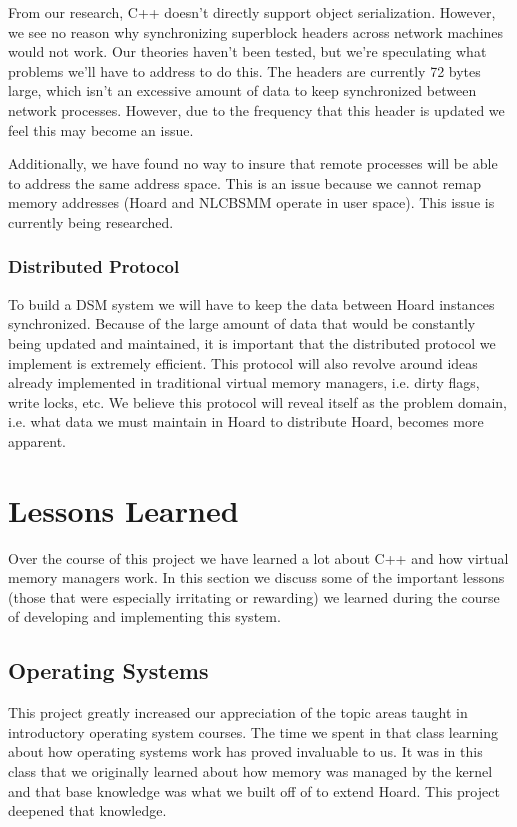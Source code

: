 \documentclass[9pt]{sig-alternate-10pt}
\begin{document}
From our research, C++ doesn't directly support object serialization.  However, we see no reason why synchronizing superblock headers across network machines would not work.  Our theories haven't been tested, but we're speculating what problems we'll have to address to do this.  The headers are currently 72 bytes large, which isn't an excessive amount of data to keep synchronized between network processes. However, due to the frequency that this header is updated we feel this may become an issue.

Additionally, we have found no way to insure that remote processes will be able to address the same address space.  This is an issue because we cannot remap memory addresses (Hoard and NLCBSMM operate in user space).  This issue is currently being researched.

\subsubsection{Distributed Protocol}
To build a DSM system we will have to keep the data between Hoard instances synchronized.  Because of the large amount of data that would be constantly being updated and maintained, it is important that the distributed protocol we implement is extremely efficient.  This protocol will also revolve around ideas already implemented in traditional virtual memory managers, i.e. dirty flags, write locks, etc.  We believe this protocol will reveal itself as the problem domain, i.e. what data we must maintain in Hoard to distribute Hoard, becomes more apparent.

\section{Lessons Learned}
\label {lessons learned}
Over the course of this project we have learned a lot about C++ and how virtual memory managers work. In this section we discuss some of the important lessons (those that were especially irritating or rewarding) we learned during the course of developing and implementing this system.

\subsection{Operating Systems}
This project greatly increased our appreciation of the topic areas taught in introductory operating system courses. The time we spent in that class learning about how operating systems work has proved invaluable to us. It was in this class that we originally learned about how memory was managed by the kernel and that base knowledge was what we built off of to extend Hoard.  This project deepened that knowledge. 
\end{document}
